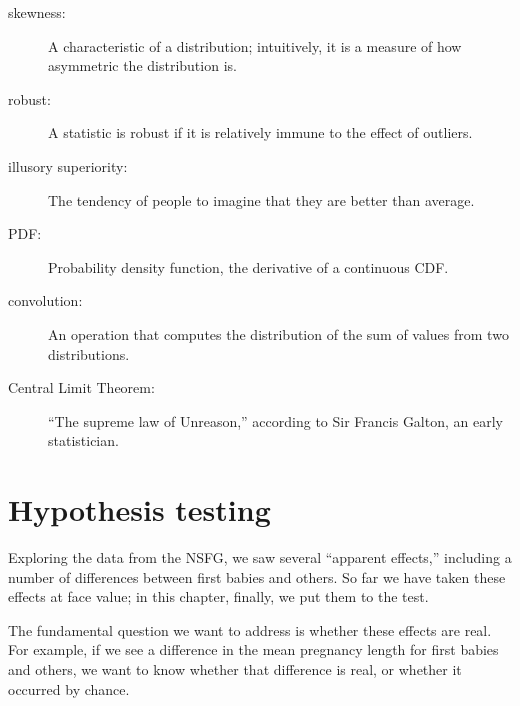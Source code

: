 \documentclass[12pt]{book}
\begin{document}
\begin{description}

\item[skewness:] A characteristic of a distribution; intuitively, it
is a measure of how asymmetric the distribution is.

\item[robust:] A statistic is robust if it is relatively immune to the
  effect of outliers.

\item[illusory superiority:] The tendency of people to imagine that
they are better than average.

\item[PDF:] Probability density function, the derivative of a continuous CDF.

\item[convolution:] An operation that computes the distribution of the
sum of values from two distributions. 



\item[Central Limit Theorem:] ``The supreme law of Unreason,'' according
to Sir Francis Galton, an early statistician.

\end{description}


\chapter{Hypothesis testing}
\label{testing}

Exploring the data from the NSFG, we saw several ``apparent effects,''
including a number of differences between first babies and others.
So far we have taken these effects at face value; in this chapter,
finally, we put them to the test.


The fundamental question we want to address is whether these effects
are real.  For example, if we see a difference in the mean pregnancy
length for first babies and others, we want to know whether that
difference is real, or whether it occurred by chance.
\end{document}
